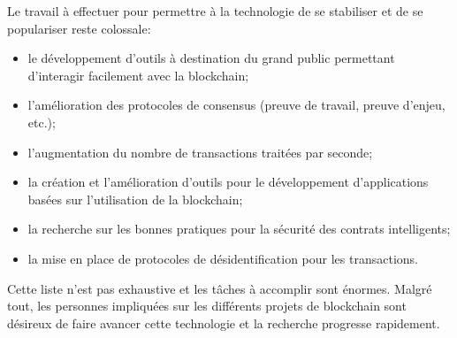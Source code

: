 \documentclass{tnreport}
\begin{document}
Le travail à effectuer pour permettre à la technologie de se stabiliser et de se populariser reste colossale:
\begin{itemize}
	\item le développement d'outils à destination du grand public permettant d'interagir facilement avec la blockchain;
	\item l'amélioration des protocoles de consensus (preuve de travail, preuve d'enjeu, etc.);
	\item l'augmentation du nombre de transactions traitées par seconde;
	\item la création et l'amélioration d'outils pour le développement d'applications basées sur l'utilisation de la blockchain;
	\item la recherche sur les bonnes pratiques pour la sécurité des contrats intelligents;
	\item la mise en place de protocoles de désidentification pour les transactions.
	\newline
\end{itemize}
Cette liste n'est pas exhaustive et les tâches à accomplir sont énormes.
Malgré tout, les personnes impliquées sur les différents projets de blockchain sont désireux de faire avancer cette technologie et la recherche progresse rapidement.
\end{document}
